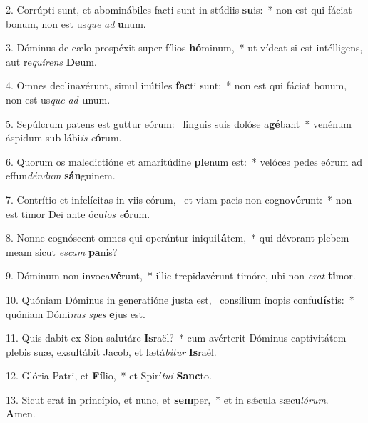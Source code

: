 2. Corrúpti sunt, et abominábiles facti sunt in stúdiis \textbf{su}is:~*  non est qui fáciat bonum, non est us\textit{que} \textit{ad} \textbf{u}num.\

3. Dóminus de cælo prospéxit super fílios \textbf{hó}minum,~*  ut vídeat si est intélligens, aut re\textit{quí}\textit{rens} \textbf{De}um.\

4. Omnes declinavérunt, simul inútiles \textbf{fac}ti sunt:~*  non est qui fáciat bonum, non est us\textit{que} \textit{ad} \textbf{u}num.\

5. Sepúlcrum patens est guttur eórum: \dag\  linguis suis dolóse a\textbf{gé}bant~*  venénum áspidum sub lábi\textit{is} \textit{e}\textbf{ó}rum.\

6. Quorum os maledictióne et amaritúdine \textbf{ple}num est:~*  velóces pedes eórum ad effun\textit{dén}\textit{dum} \textbf{sán}guinem.\

7. Contrítio et infelícitas in viis eórum, \dag\  et viam pacis non cogno\textbf{vé}runt:~*  non est timor Dei ante ócu\textit{los} \textit{e}\textbf{ó}rum.\

8. Nonne cognóscent omnes qui operántur iniqui\textbf{tá}tem,~*  qui dévorant plebem meam sicut \textit{es}\textit{cam} \textbf{pa}nis?\

9. Dóminum non invoca\textbf{vé}runt,~*  illic trepidavérunt timóre, ubi non \textit{e}\textit{rat} \textbf{ti}mor.\

10. Quóniam Dóminus in generatióne justa est, \dag\  consílium ínopis confu\textbf{dís}tis:~*  quóniam Dómi\textit{nus} \textit{spes} \textbf{e}jus est.\

11. Quis dabit ex Sion salutáre \textbf{Is}raël?~*  cum avérterit Dóminus captivitátem plebis suæ, exsultábit Jacob, et lætá\textit{bi}\textit{tur} \textbf{Is}raël.\

12. Glória Patri, et \textbf{Fí}lio,~*  et Spirí\textit{tu}\textit{i} \textbf{Sanc}to.\

13. Sicut erat in princípio, et nunc, et \textbf{sem}per,~*  et in sǽcula sæcu\textit{ló}\textit{rum}. \textbf{A}men.\


